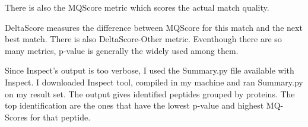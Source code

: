 \documentclass{article}
\begin{document}
There is also the MQScore metric which scores the actual match quality. 

DeltaScore measures the difference between MQScore for this match and the next best match. There is also DeltaScore-Other metric. Eventhough there are so many metrics, p-value is generally the widely used among them. 
 
Since Inspect's output is too verbose, I used the Summary.py file available with Inspect. I downloaded Inspect tool, compiled in my machine and ran Summary.py on my result set. The output gives identified peptides grouped by proteins. The top identification are the ones that have the lowest p-value and highest MQ-Scores for that peptide. 
\end{document}
